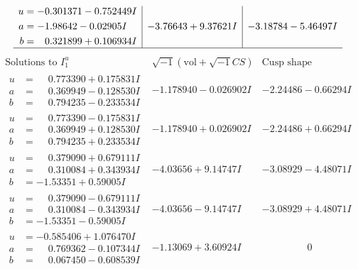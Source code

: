 \documentclass[1p]{elsarticle_modified}
\theoremstyle{definition}
\newcommand{\I}{\sqrt{-1}}
\begin{document}
$$\begin{array}{c|c|c}
\begin{aligned}
u &= -0.301371 - 0.752449 I \\
a &= -1.98642 - 0.02905 I \\
b &= \phantom{-}0.321899 + 0.106934 I\end{aligned}
 & -3.76643 + 9.37621 I & -3.18784 - 5.46497 I\\
 \hline 
 \end{array}$$\newpage$$\begin{array}{c|c|c}  
\text{Solutions to }I^u_{1}& \I (\text{vol} + \sqrt{-1}CS) & \text{Cusp shape}\\
 \hline 
\begin{aligned}
u &= \phantom{-}0.773390 + 0.175831 I \\
a &= \phantom{-}0.369949 - 0.128530 I \\
b &= \phantom{-}0.794235 - 0.233534 I\end{aligned}
 & -1.178940 - 0.026902 I & -2.24486 - 0.66294 I \\ \hline\begin{aligned}
u &= \phantom{-}0.773390 - 0.175831 I \\
a &= \phantom{-}0.369949 + 0.128530 I \\
b &= \phantom{-}0.794235 + 0.233534 I\end{aligned}
 & -1.178940 + 0.026902 I & -2.24486 + 0.66294 I \\ \hline\begin{aligned}
u &= \phantom{-}0.379090 + 0.679111 I \\
a &= \phantom{-}0.310084 + 0.343934 I \\
b &= -1.53351 + 0.59005 I\end{aligned}
 & -4.03656 + 9.14747 I & -3.08929 - 4.48071 I \\ \hline\begin{aligned}
u &= \phantom{-}0.379090 - 0.679111 I \\
a &= \phantom{-}0.310084 - 0.343934 I \\
b &= -1.53351 - 0.59005 I\end{aligned}
 & -4.03656 - 9.14747 I & -3.08929 + 4.48071 I \\ \hline\begin{aligned}
u &= -0.585406 + 1.076470 I \\
a &= \phantom{-}0.769362 - 0.107344 I \\
b &= \phantom{-}0.067450 - 0.608539 I\end{aligned}
 & -1.13069 + 3.60924 I & \phantom{-0.000000 } 0 \\ \hline\begin{aligned}

\end{aligned}
\end{array}$$
\end{document}
